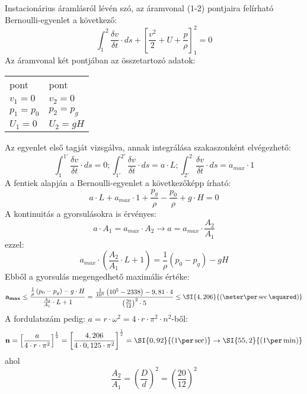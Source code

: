 Instacionárius áramlásról lévén szó, az áramvonal (1-2) pontjaira felírható Bernoulli-egyenlet a következő:
\begin{equation*}
	\int_{1}^{2}{\frac{\delta v}{\delta t}\cdot ds + \left[{\frac{v^2}{2} + U + \frac{p}{\rho}}\right]_1^2}=0
\end{equation*}
Az áramvonal két pontjában az összetartozó adatok:
\begin{center}
	\begin{tabular}{ll}
		\circled{1} pont & \circled{2} pont \\
		$v_1=0$ & $v_2=0$ \\
		$p_1=p_0$ & $p_2=p_g$ \\
		$U_1=0$ & $U_2=gH$
	\end{tabular}
\end{center}
Az egyenlet első tagját vizsgálva, annak integrálása szakaszonként elvégezhető:
\begin{equation*}
	\int_{1}^{1'}{\frac{\delta v}{\delta t}\cdot ds = 0};
	\int_{1'}^{2'}{\frac{\delta v}{\delta t}\cdot ds = a\cdot L};
	\int_{2'}^{2}{\frac{\delta v}{\delta t}\cdot ds = a_{max}\cdot 1}
\end{equation*}
A fentiek alapján a Bernoulli-egyenlet a következőképp írható:
\begin{equation*}
	a\cdot L+a_{max}\cdot 1+\frac{p_g}{\rho}-\frac{p_0}{\rho}+g\cdot H = 0
\end{equation*}
A kontinuitás a gyorsulásokra is érvényes:
\begin{equation*}
	a\cdot A_1 = a_{max}\cdot A_2 \rightarrow a=a_{max}\cdot\frac{A_2}{A_1}
\end{equation*}
ezzel:
\begin{equation*}
	a_{max}\cdot\left(\frac{A_2}{A_1}\cdot L+1\right)=\frac{1}{\rho}\left(p_0-p_g\right)-gH
\end{equation*}
Ebből a gyorsulás megengedhető maximális értéke:
\begin{equation*}
	\bold{a_{max}} \le \frac{ \frac{1}{\rho} \left( p_0-p_g \right) -g\cdot H }{ \frac{A_2}{A_1} \cdot L+1 } = \frac{ \frac{1}{10^3}\left( 10^5 -2338 \right) - 9,81 \cdot 4}{\left(\frac{20}{12}\right)^2 \cdot 5} \le \SI{4,206}{\left(\meter\per\sec\squared\right)}
\end{equation*}
A fordulatszám pedig: \(a=r\cdot \omega^2=4\cdot r\cdot \pi^2 \cdot n^2\)-ből:
\begin{equation*}
	\bold{n} = \left[ \frac{a}{4 \cdot r \cdot \pi ^2} \right]^\frac{1}{2}=\left[ \frac{4,206}{4 \cdot 0,125 \cdot \pi^2} \right]^\frac{1}{2}=\SI{0,92}{\left(1\per\sec\right)} \rightarrow \SI{55,2}{\left(1\per\min\right)}
\end{equation*}
ahol
\begin{equation*}
	\frac{A_2}{A_1}=\left( \frac{D}{d} \right)^2=\left( \frac{20}{12} \right)^2 
\end{equation*}